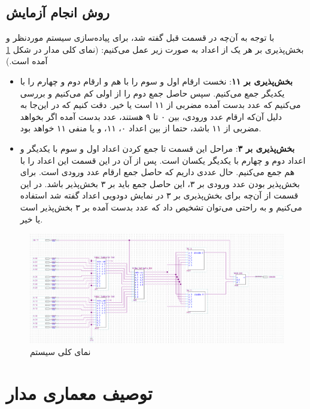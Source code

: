 \documentclass[12pt,onecolumn,a4paper,fleqn]{article}
\begin{document}
	\subsection{روش انجام آزمایش}
	با توجه به آن‌چه در قسمت قبل گفته شد، برای پیاده‌سازی سیستم موردنظر و بخش‌پذیری بر هر یک از اعداد به صورت زیر عمل می‌کنیم: (نمای کلی مدار در شکل
	\ref{topModule}
	آمده است.)
	\begin{itemize}
		\item \textbf{بخش‌پذیری بر ۱۱}:
		نخست ارقام اول و سوم را با هم و ارقام دوم و چهارم را با یکدیگر جمع می‌کنیم. سپس حاصل جمع دوم را از اولی کم می‌کنیم و بررسی می‌کنیم که عدد بدست آمده مضربی از ۱۱ است یا خیر. دقت کنیم که در این‌جا به دلیل آن‌که ارقام عدد ورودی، بین ۰ تا ۹ هستند، عدد بدست آمده اگر بخواهد مضربی از ۱۱ باشد، حتما از بین اعداد ۰، ۱۱، و یا منفی ۱۱ خواهد بود.
		\item \textbf{بخش‌پذیری بر ۳}:
		مراحل این قسمت تا جمع کردن اعداد اول و سوم با یکدیگر و اعداد دوم و چهارم با یکدیگر یکسان است. پس از آن در این قسمت این اعداد را با هم جمع می‌کنیم. حال عددی داریم که حاصل جمع ارقام عدد ورودی‌ است. برای بخش‌پذیر بودن عدد ورودی بر ۳، این حاصل جمع باید بر ۳ بخش‌پذیر باشد. در این قسمت از آن‌چه برای بخش‌پذیری بر ۳ در نمایش دودویی اعداد گفته شد استفاده می‌کنیم و به راحتی می‌توان تشخیص داد که عدد بدست آمده بر ۳ بخش‌پذیر است یا خیر.
	\end{itemize} 
	\begin{figure}[H]
		\centering
		\includegraphics[scale=0.45]{source/top_module.png}
		\caption{نمای کلی سیستم}
		\label{topModule}
	\end{figure}
	\pagebreak
	\section{توصیف معماری مدار}
	
\end{document}
